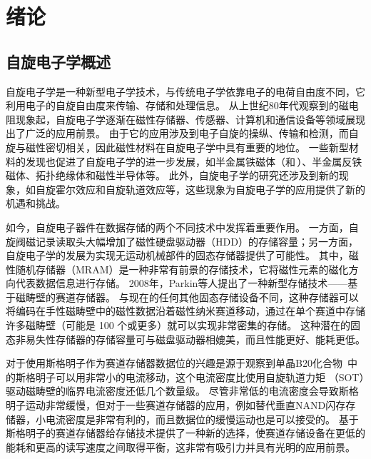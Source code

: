 \chapter{绪论}
\section{自旋电子学概述}
自旋电子学是一种新型电子学技术，与传统电子学依靠电子的电荷自由度不同，它利用电子的自旋自由度来传输、存储和处理信息。
从上世纪80年代观察到的磁电阻现象起，自旋电子学逐渐在磁性存储器、传感器、计算机和通信设备等领域展现出了广泛的应用前景。
由于它的应用涉及到电子自旋的操纵、传输和检测，而自旋与磁性密切相关，因此磁性材料在自旋电子学中具有重要的地位。
一些新型材料的发现也促进了自旋电子学的进一步发展，如半金属铁磁体（和\,）、半金属反铁磁体、拓扑绝缘体和磁性半导体等。
此外，自旋电子学的研究还涉及到新的现象，如自旋霍尔效应和自旋轨道效应等，这些现象为自旋电子学的应用提供了新的机遇和挑战。\par
如今，自旋电子器件在数据存储的两个不同技术中发挥着重要作用。
一方面，自旋阀磁记录读取头大幅增加了磁性硬盘驱动器（HDD）的存储容量；另一方面，自旋电子学的发展为实现无运动机械部件的固态存储器提供了可能性。
其中，磁性随机存储器（MRAM）是一种非常有前景的存储技术，它将磁性元素的磁化方向代表数据信息进行存储。
2008年，Parkin等人\cite{parkin2008magnetic}提出了一种新型存储技术——基于磁畴壁的赛道存储器。
与现在的任何其他固态存储设备不同，这种存储器可以将编码在手性磁畴壁中的磁性数据沿着磁性纳米赛道移动，通过在单个赛道中存储许多磁畴壁（可能是 100
个或更多）就可以实现非常密集的存储。
这种潜在的固态非易失性存储器的存储容量可与磁盘驱动器相媲美，而且性能更好、能耗更低。\par
对于使用斯格明子作为赛道存储器数据位的兴趣是源于观察到单晶B20化合物\ 中的斯格明子可以用非常小的电流移动，这个电流密度比使用自旋轨道力矩
（SOT）驱动磁畴壁的临界电流密度还低几个数量级。%
尽管非常低的电流密度会导致斯格明子运动非常缓慢，但对于一些赛道存储器的应用，例如替代垂直NAND闪存存储器，小电流密度是非常有利的，而且数据位的缓慢运动也是可以接受的。
基于斯格明子的赛道存储器给存储技术提供了一种新的选择，使赛道存储设备在更低的能耗和更高的读写速度之间取得平衡，这非常有吸引力并具有光明的应用前景。
